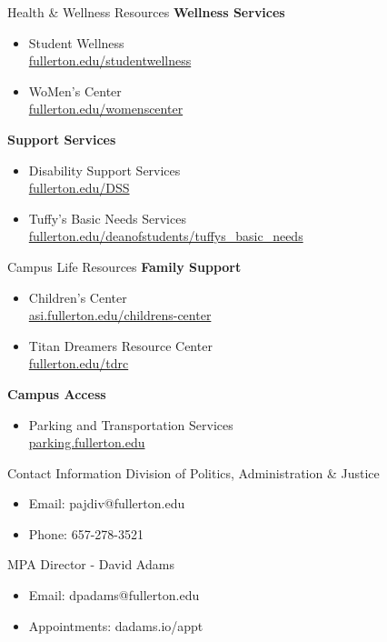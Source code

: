 \documentclass[10pt]{beamer}
\begin{document}
    \begin{frame}{Health \& Wellness Resources}
    \textbf{Wellness Services}
    \begin{itemize}
    \item Student Wellness \\
        \small{\url{fullerton.edu/studentwellness}}
    \item WoMen's Center \\
        \small{\url{fullerton.edu/womenscenter}}
    \end{itemize}
    
    \textbf{Support Services}
    \begin{itemize}
    \item Disability Support Services \\
        \small{\url{fullerton.edu/DSS}}
    \item Tuffy's Basic Needs Services \\
        \small{\url{fullerton.edu/deanofstudents/tuffys_basic_needs}}
    \end{itemize}
    \end{frame}
    
    \begin{frame}{Campus Life Resources}
    \textbf{Family Support}
    \begin{itemize}
    \item Children's Center \\
        \small{\url{asi.fullerton.edu/childrens-center}}
    \item Titan Dreamers Resource Center \\
        \small{\url{fullerton.edu/tdrc}}
    \end{itemize}
    
    \textbf{Campus Access}
    \begin{itemize}
    \item Parking and Transportation Services \\
        \small{\url{parking.fullerton.edu}}
    \end{itemize}
    \end{frame}

\begin{frame}{Contact Information}
Division of Politics, Administration \& Justice
\begin{itemize}
\item Email: pajdiv@fullerton.edu
\item Phone: 657-278-3521
\end{itemize}

MPA Director - David Adams
\begin{itemize}
\item Email: dpadams@fullerton.edu
\item Appointments: dadams.io/appt 
\end{itemize}
\end{frame}
\end{document}
